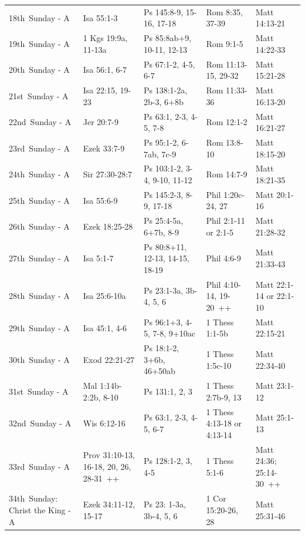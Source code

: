 \documentclass{book}
\begin{document}
\begin{tabular}{l l l l l}
18th Sunday - A  &  Isa 55:1-3  &  Ps 145:8-9, 15-16, 17-18  &  Rom 8:35, 37-39  &  Matt 14:13-21\\
19th Sunday - A  &  1 Kgs 19:9a, 11-13a  &  Ps 85:8ab+9, 10-11, 12-13  &  Rom 9:1-5  &  Matt 14:22-33\\
20th Sunday - A  &  Isa 56:1, 6-7  &  Ps 67:1-2, 4-5, 6-7  &  Rom 11:13-15, 29-32  &  Matt 15:21-28\\
21st Sunday - A  &  Isa 22:15, 19-23  &  Ps 138:1-2a, 2b-3, 6+8b  &  Rom 11:33-36  &  Matt 16:13-20\\
22nd Sunday - A  &  Jer 20:7-9  &  Ps 63:1, 2-3, 4-5, 7-8  &  Rom 12:1-2  &  Matt 16:21-27\\
23rd Sunday - A  &  Ezek 33:7-9  &  Ps 95:1-2, 6-7ab, 7c-9  &  Rom 13:8-10  &  Matt 18:15-20\\
24th Sunday - A  &  Sir 27:30-28:7  &  Ps 103:1-2, 3-4, 9-10, 11-12  &  Rom 14:7-9  &  Matt 18:21-35\\
25th Sunday - A  &  Isa 55:6-9  &  Ps 145:2-3, 8-9, 17-18  &  Phil 1:20c-24, 27  &  Matt 20:1-16\\
26th Sunday - A  &  Ezek 18:25-28  &  Ps 25:4-5a, 6+7b, 8-9  &  Phil 2:1-11 or 2:1-5  &  Matt 21:28-32\\
27th Sunday - A  &  Isa 5:1-7  &  Ps 80:8+11, 12-13, 14-15, 18-19  &  Phil 4:6-9  &  Matt 21:33-43\\
28th Sunday - A  &  Isa 25:6-10a  &  Ps 23:1-3a, 3b-4, 5, 6  &  Phil 4:10-14, 19-20 ++  &  Matt 22:1-14 or 22:1-10\\
29th Sunday - A  &  Isa 45:1, 4-6  &  Ps 96:1+3, 4-5, 7-8, 9+10ac  &  1 Thess 1:1-5b  &  Matt 22:15-21\\
30th Sunday - A  &  Exod 22:21-27  &  Ps 18:1-2, 3+6b, 46+50ab  &  1 Thess 1:5c-10  &  Matt 22:34-40\\
31st Sunday - A  &  Mal 1:14b-2:2b, 8-10  &  Ps 131:1, 2, 3  &  1 Thess 2:7b-9, 13  &  Matt 23:1-12\\
32nd Sunday - A  &  Wis 6:12-16  &  Ps 63:1, 2-3, 4-5, 6-7  &  1 Thess 4:13-18 or 4:13-14  &  Matt 25:1-13\\
33rd Sunday - A  &  Prov 31:10-13, 16-18, 20, 26, 28-31 ++  &  Ps 128:1-2, 3, 4-5  &  1 Thess 5:1-6  &  Matt 24:36; 25:14-30 ++\\
34th Sunday: Christ the King - A  &  Ezek 34:11-12, 15-17  &  Ps 23: 1-3a, 3b-4, 5, 6  &  1 Cor 15:20-26, 28  &  Matt 25:31-46
\end{tabular}
\end{document}
